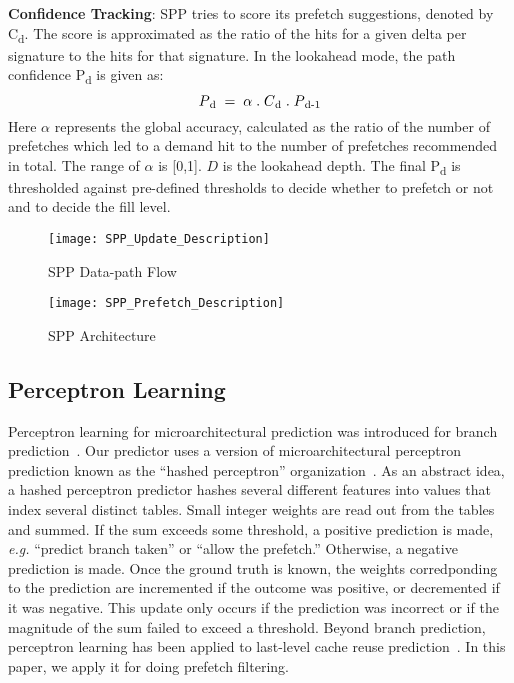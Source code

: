 \noindent \textbf{Confidence Tracking}: 
SPP tries to score its prefetch suggestions, denoted by C\textsubscript{d}.
The score is approximated as the ratio of the hits for a given delta per
signature to the hits for that signature. In the lookahead mode, the path
confidence P\textsubscript{d} is given as: $$P\textsubscript{d} \;=\; \alpha  
\;.\;  C\textsubscript{d}  \;.\; P\textsubscript{d-1}$$ Here $\alpha$ represents 
the global accuracy, calculated as the ratio of the number of prefetches which 
led to a demand hit to the number of prefetches recommended in total. The range
of $\alpha$ is [0,1].  $D$ is the lookahead depth. The final P\textsubscript{d} 
is thresholded against pre-defined thresholds to decide whether to prefetch or 
not and to decide the fill level.

\begin{figure}
  \begin{center}
  \texttt{[image: SPP\_Update\_Description]}
  \caption{SPP Data-path Flow}
  \label{fig:spp_update}
  \end{center}
\end{figure}


\begin{figure}
  \begin{center}
  \texttt{[image: SPP\_Prefetch\_Description]}
  \caption{SPP Architecture}
  \label{fig:spp_structure}
  \end{center}
\end{figure}

\subsection{Perceptron Learning}
\label{sec:Background-Perceptron}
Perceptron learning for microarchitectural prediction was introduced
for branch prediction~\cite{PerceptronPredictor}. Our predictor uses a
version of microarchitectural perceptron prediction known as the
``hashed perceptron'' organization~\cite{HashedPerceptron}. As an
abstract idea, a hashed perceptron predictor hashes several different
features into values that index several distinct tables. Small integer
weights are read out from the tables and summed. If the sum exceeds
some threshold, a positive prediction is made, {\em e.g.} ``predict
branch taken'' or ``allow the prefetch.'' Otherwise, a negative
prediction is made. Once the ground truth is known, the weights
corredponding to the prediction are incremented if the outcome was
positive, or decremented if it was negative. This update only occurs
if the prediction was incorrect or if the magnitude of the sum failed
to exceed a threshold.  Beyond branch prediction, perceptron learning
has been applied to last-level cache reuse
prediction~\cite{Perc_Reuse,Multiperspective}. In this paper, we apply
it for doing prefetch filtering.
